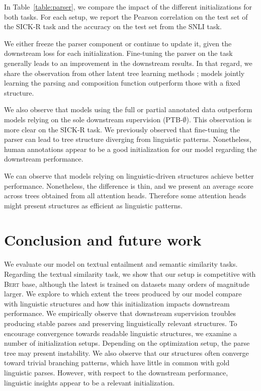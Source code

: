 In Table~\ref{table:parser}, we compare the impact of the different initializations for both tasks. For each setup, we report the Pearson correlation on the test set of the SICK-R task and the accuracy on the test set from the SNLI task.

We either freeze the parser component or continue to update it, given the downstream loss for each initialization. Fine-tuning the parser on the task generally leads to an improvement in the downstream results. In that regard, we share the observation from other latent tree learning methods \parencite{maillard_19, choi_18}; models jointly learning the parsing and composition function outperform those with a fixed structure. 

We also observe that models using the full or partial annotated data outperform models relying on the sole downstream supervision (PTB-$\emptyset$). This observation is more clear on the SICK-R task. We previously observed that fine-tuning the parser can lead to tree structure diverging from linguistic patterns. Nonetheless, human annotations appear to be a good initialization for our model regarding the downstream performance. 

We can observe that models relying on linguistic-driven structures achieve better performance. Nonetheless, the difference is thin, and we present an average score across trees obtained from all attention heads. Therefore some attention heads might present structures as efficient as linguistic patterns.

\section{Conclusion and future work}

We evaluate our model on textual entailment and semantic similarity tasks. Regarding the textual similarity task, we show that our setup is competitive with \textsc{Bert} base, although the latest is trained on datasets many orders of magnitude larger. We explore to which extent the trees produced by our model compare with linguistic structures and how this initialization impacts downstream performance. We empirically observe that downstream supervision troubles producing stable parses and preserving linguistically relevant structures.  %
To encourage convergence towards readable linguistic structures, we examine a number of initialization setups. Depending on the optimization setup, the parse tree may present instability. We also observe that our structures often converge toward trivial branching patterns, which have little in common with gold linguistic parses. However, with respect to the downstream performance, linguistic insights appear to be a relevant initialization.